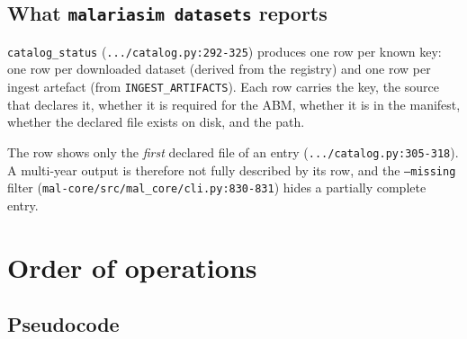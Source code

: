 \documentclass[11pt,a4paper]{article}
\newcommand{\code}[1]{\texttt{#1}}
\begin{document}
\subsection{What \code{malariasim datasets} reports}
\label{sec:datasets-report}

\code{catalog\_status} (\code{.../catalog.py:292-325}) produces one row per
known key: one row per downloaded dataset (derived from the registry) and one
row per ingest artefact (from \code{INGEST\_ARTIFACTS}). Each row carries the
key, the source that declares it, whether it is required for the ABM, whether
it is in the manifest, whether the declared file exists on disk, and the path.

The row shows only the \emph{first} declared file of an entry
(\code{.../catalog.py:305-318}). A multi-year output is therefore not fully
described by its row, and the \code{--missing} filter
(\code{mal-core/src/mal\_core/cli.py:830-831}) hides a partially complete
entry.

\section{Order of operations}
\label{sec:order}

\subsection{Pseudocode}
\end{document}
